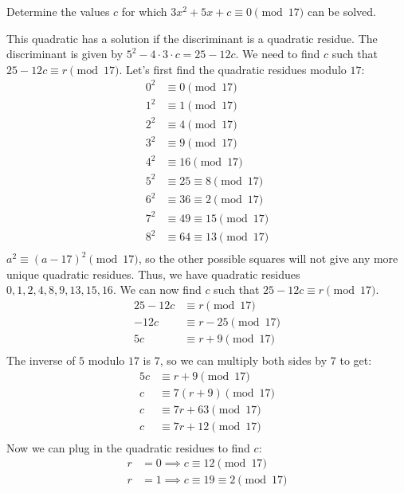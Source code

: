 \documentclass{article}
\begin{document}
\begin{problem}{}{}
    Determine the values $c$ for which $3x^2+5x+c\equiv0\pmod{17}$ can be solved.
\end{problem}
\begin{solution}{}{}
    This quadratic has a solution if the discriminant is a quadratic residue. The discriminant is given by $5^2-4\cdot3\cdot c=25-12c$. We need to find $c$ such that $25-12c\equiv r\pmod{17}$. Let's first find the quadratic residues modulo $17$:
    \begin{align*}
        0^2&\equiv0\pmod{17}\\
        1^2&\equiv1\pmod{17}\\
        2^2&\equiv4\pmod{17}\\
        3^2&\equiv9\pmod{17}\\
        4^2&\equiv16\pmod{17}\\
        5^2&\equiv25\equiv8\pmod{17}\\
        6^2&\equiv36\equiv2\pmod{17}\\
        7^2&\equiv49\equiv15\pmod{17}\\
        8^2&\equiv64\equiv13\pmod{17}\\
    \end{align*}
    $a^2\equiv(a-17)^2\pmod{17}$, so the other possible squares will not give any more unique quadratic residues. Thus, we have quadratic residues $0,1,2,4,8,9,13,15,16$. We can now find $c$ such that $25-12c\equiv r\pmod{17}$.
    \begin{align*}
        25-12c&\equiv r\pmod{17}\\
        -12c&\equiv r-25\pmod{17}\\
        5c&\equiv r+9\pmod{17}\\
    \end{align*}
    The inverse of $5$ modulo $17$ is $7$, so we can multiply both sides by $7$ to get:
    \begin{align*}
        5c&\equiv r+9\pmod{17}\\
        c&\equiv 7(r+9)\pmod{17}\\
        c&\equiv 7r+63\pmod{17}\\
        c&\equiv 7r+12\pmod{17}\\
    \end{align*}
    Now we can plug in the quadratic residues to find $c$:
    \begin{align*}
        r&=0\implies c\equiv12\pmod{17}\\
        r&=1\implies c\equiv19\equiv2\pmod{17}\\

\end{align*}
\end{solution}
\end{document}
